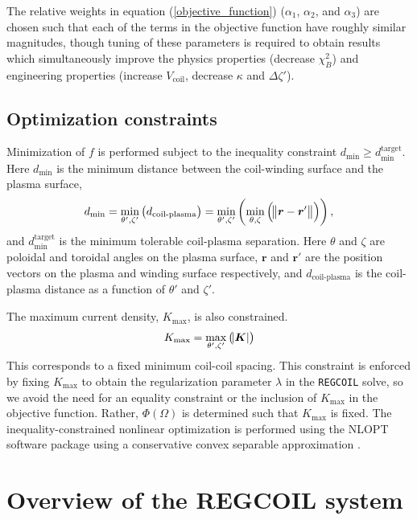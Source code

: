 \documentclass[aps,unsortedaddress]{revtex4-1}
\begin{document}
The relative weights in equation (\ref{objective_function}) ($\alpha_1$, $\alpha_2$, and $\alpha_3$) are chosen such that each of the terms in the objective function have roughly similar magnitudes, though tuning of these parameters is required to obtain results which simultaneously improve the physics properties (decrease $\chi^2_B$) and engineering properties (increase $V_{\text{coil}}$, decrease $\kappa$ and $\Delta \zeta'$).

\FloatBarrier
\subsection{Optimization constraints}
\label{sect_constraint}

Minimization of $f$ is performed subject to the inequality constraint $d_{\text{min}} \geq d_{\text{min}}^{\text{target}}$. Here $d_{\text{min}}$ is the minimum distance between the coil-winding surface and the plasma surface,
\begin{gather}
d_{\text{min}} = \min_{\theta',\zeta'} \left( d_{\text{coil-plasma}} \right) = \min_{\theta',\zeta'} \left( \min_{\theta, \zeta} \left( \norm{ \bm{r} - \bm{r}' } \right) \right),
\end{gather}
and $d_{\text{min}}^{\text{target}}$ is the minimum tolerable coil-plasma separation. Here $\theta$ and $\zeta$ are poloidal and toroidal angles on the plasma surface, $\bm{r}$ and $\bm{r}'$ are the position vectors on the plasma and winding surface respectively, and $d_{\text{coil-plasma}}$ is the coil-plasma distance as a function of $\theta'$ and $\zeta'$. 

The maximum current density, $K_{\text{max}}$, is also constrained. 
\begin{gather}
K_{\text{max}} = \max_{\theta',\zeta'} \left( \abs{\bm{K}} \right)
\end{gather}
This corresponds to a fixed minimum coil-coil spacing. This constraint is enforced by fixing $K_{\text{max}}$ to obtain the regularization parameter $\lambda$ in the \texttt{REGCOIL} solve, so we avoid the need for an equality constraint or the inclusion of $K_{\text{max}}$ in the objective function. Rather, $\Phi(\Omega)$ is determined such that $K_{\text{max}}$ is fixed. The inequality-constrained nonlinear optimization is performed using the NLOPT \cite{NLOPT} software package using a conservative convex separable approximation \cite{Svanberg2002}. 

\section{Overview of the REGCOIL system}
\label{section_REGCOIL}
\end{document}
